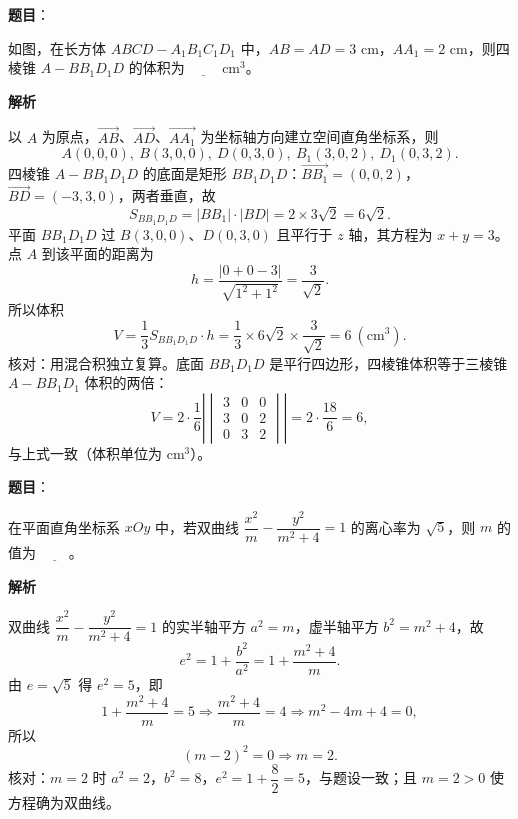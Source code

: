 \begin{answer}

\textbf{题目}：

如图，在长方体 $ABCD-A_1B_1C_1D_1$ 中，$AB=AD=3$ cm，$AA_1=2$ cm，则四棱锥 $A-BB_1D_1D$ 的体积为 $\underline{\qquad}$ cm$^3$。
\nopagebreak[4]
\begin{center}\end{center}
\nopagebreak[4]
\textbf{解析}

以 $A$ 为原点，$\overrightarrow{AB}$、$\overrightarrow{AD}$、$\overrightarrow{AA_1}$ 为坐标轴方向建立空间直角坐标系，则
\nopagebreak[4]
\[A(0,0,0),\ B(3,0,0),\ D(0,3,0),\ B_1(3,0,2),\ D_1(0,3,2).\]
四棱锥 $A-BB_1D_1D$ 的底面是矩形 $BB_1D_1D$：$\overrightarrow{BB_1}=(0,0,2)$，$\overrightarrow{BD}=(-3,3,0)$，两者垂直，故
\nopagebreak[4]
\[S_{BB_1D_1D}=|BB_1|\cdot|BD|=2\times3\sqrt2=6\sqrt2.\]
平面 $BB_1D_1D$ 过 $B(3,0,0)$、$D(0,3,0)$ 且平行于 $z$ 轴，其方程为 $x+y=3$。点 $A$ 到该平面的距离为
\nopagebreak[4]
\[h=\frac{|0+0-3|}{\sqrt{1^2+1^2}}=\frac{3}{\sqrt2}.\]
所以体积
\nopagebreak[4]
\[V=\frac13 S_{BB_1D_1D}\cdot h=\frac13\times6\sqrt2\times\frac{3}{\sqrt2}=6\ \left(\text{cm}^3\right).\]
核对：用混合积独立复算。底面 $BB_1D_1D$ 是平行四边形，四棱锥体积等于三棱锥 $A-BB_1D_1$ 体积的两倍：
\nopagebreak[4]
\[V=2\cdot\frac16\left|\begin{vmatrix}3&0&0\\3&0&2\\0&3&2\end{vmatrix}\right|=2\cdot\frac{18}{6}=6,\]
与上式一致（体积单位为 cm$^3$）。


\end{answer}
\begin{answer}

\textbf{题目}：

在平面直角坐标系 $xOy$ 中，若双曲线 $\dfrac{x^2}{m}-\dfrac{y^2}{m^2+4}=1$ 的离心率为 $\sqrt5$，则 $m$ 的值为 $\underline{\qquad}$。

\textbf{解析}

双曲线 $\dfrac{x^2}{m}-\dfrac{y^2}{m^2+4}=1$ 的实半轴平方 $a^2=m$，虚半轴平方 $b^2=m^2+4$，故
\nopagebreak[4]
\[e^2=1+\frac{b^2}{a^2}=1+\frac{m^2+4}{m}.\]
由 $e=\sqrt5$ 得 $e^2=5$，即
\nopagebreak[4]
\[1+\frac{m^2+4}{m}=5\Longrightarrow\frac{m^2+4}{m}=4\Longrightarrow m^2-4m+4=0,\]
所以
\nopagebreak[4]
\[(m-2)^2=0\Longrightarrow m=2.\]
核对：$m=2$ 时 $a^2=2$，$b^2=8$，$e^2=1+\dfrac82=5$，与题设一致；且 $m=2>0$ 使方程确为双曲线。


\end{answer}
